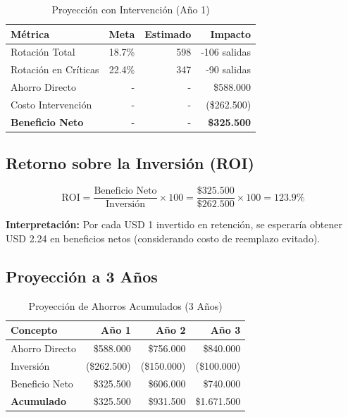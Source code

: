 \documentclass[11pt,a4paper,twoside]{article}
\begin{document}
\begin{table}[H]
    \centering
    \caption{Proyección con Intervención (Año 1)}
    \begin{tabular}{|l|r|r|r|}
        \toprule
        \textbf{Métrica} & \textbf{Meta} & \textbf{Estimado} & \textbf{Impacto} \\
        \midrule
        Rotación Total & 18.7\% & 598 & -106 salidas \\
        Rotación en Críticas & 22.4\% & 347 & -90 salidas \\
        Ahorro Directo & - & - & \$588.000 \\
        Costo Intervención & - & - & (\$262.500) \\
        \midrule
        \textbf{Beneficio Neto} & - & - & \textbf{\$325.500} \\
        \bottomrule
    \end{tabular}
\end{table}

\subsection{Retorno sobre la Inversión (ROI)}

\[
\text{ROI} = \frac{\text{Beneficio Neto}}{\text{Inversión}} \times 100 = \frac{\$325.500}{\$262.500} \times 100 = 123.9\%
\]

\textbf{Interpretación:} Por cada USD 1 invertido en retención, se esperaría obtener USD 2.24 en beneficios netos (considerando costo de reemplazo evitado).

\subsection{Proyección a 3 Años}

\begin{table}[H]
    \centering
    \caption{Proyección de Ahorros Acumulados (3 Años)}
    \begin{tabular}{|l|r|r|r|}
        \toprule
        \textbf{Concepto} & \textbf{Año 1} & \textbf{Año 2} & \textbf{Año 3} \\
        \midrule
        Ahorro Directo & \$588.000 & \$756.000 & \$840.000 \\
        Inversión & (\$262.500) & (\$150.000) & (\$100.000) \\
        Beneficio Neto & \$325.500 & \$606.000 & \$740.000 \\
        \midrule
        \textbf{Acumulado} & \$325.500 & \$931.500 & \$1.671.500 \\
        \bottomrule
    \end{tabular}
\end{table}
\end{document}
